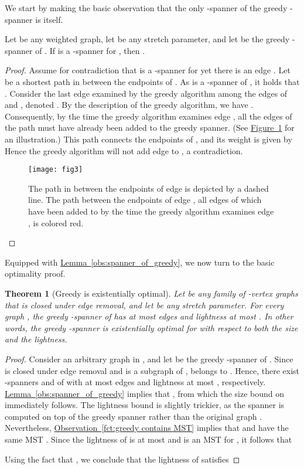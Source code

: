 \documentclass[11pt,letterpaper]{article}
\newtheorem{theorem}{Theorem}
\newcommand{\namedref}[2]{\hyperref[#2]{#1~\ref*{#2}}}
\newcommand{\figureref}[1]{\namedref{Figure}{#1}}
\newcommand{\lemmaref}[1]{\namedref{Lemma}{#1}}
\newcommand{\observationref}[1]{\namedref{Observation}{#1}}
\begin{document}
We start by making the basic observation that the only -spanner of the greedy -spanner is itself.
\begin{lemma}
	\label{obs:spanner_of_greedy}
	Let  be any weighted graph, let  be any stretch parameter, and let  be the greedy -spanner of .
	If  is a -spanner for , then .
\end{lemma}
\begin{proof}
	Assume for contradiction that  is a -spanner for  yet there is an edge .
	Let  be a shortest path in  between the endpoints of . As  is a -spanner of ,
	it holds that .
	Consider the last edge examined by the greedy algorithm among the edges of  and , denoted .
	By the description of the greedy algorithm, we have .
	Consequently, by the time the greedy algorithm examines edge , all the edges of the path  must have already been added to the greedy spanner.
	(See \figureref{fig:lem3} for an illustration.)
	This path connects the endpoints of , and its weight is given by 
	Hence the greedy algorithm will not add edge  to , a contradiction.
	\begin{figure}
		\begin{center}
			\texttt{[image: fig3]}
			\caption{\small The path  in  between the endpoints of edge  is depicted by a dashed line.
				The path  between the endpoints of edge , all edges of which have been added to  by the time the greedy algorithm examines edge ,
				is colored red.}
			\label{fig:lem3}
		\end{center}
	\end{figure}
\end{proof}



Equipped with \lemmaref{obs:spanner_of_greedy}, we now turn to the basic optimality proof.
\begin{theorem}[Greedy is existentially optimal]\label{thm:main}
	Let  be any family of -vertex graphs that is closed under edge
	removal, and let  be any stretch parameter.
	For every graph ,	the greedy -spanner  of  has at most  edges and lightness at most .
	In other words, the greedy -spanner is existentially optimal for  with respect to both the size and the lightness.
\end{theorem}
\begin{proof}
	Consider an arbitrary graph  in , and let  be the greedy -spanner of .
	Since  is closed under edge removal and  is a subgraph of ,   belongs to .
	Hence, there exist -spanners  and  of  with at most   edges and lightness at most , respectively.
	\lemmaref{obs:spanner_of_greedy} implies that , from which the size bound on  immediately follows. 
	The lightness bound is slightly trickier, as the spanner  is computed on top of the greedy spanner  rather than the original graph .
	Nevertheless, \observationref{fct:greedy contains MST} implies that  and  have the same MST .
	Since the lightness of  is at most  and  is an MST for , it follows that
	
	Using the fact that , we conclude that the lightness of  satisfies
	
\end{proof}
\end{document}
